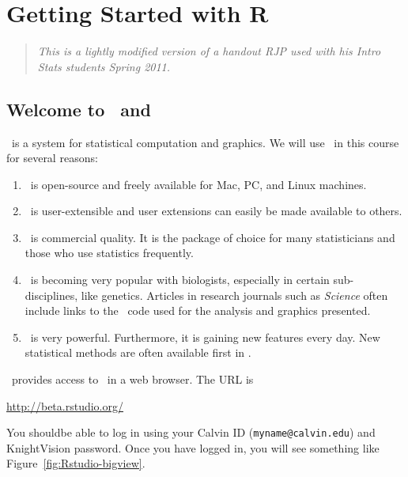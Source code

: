 \chapter{Getting Started with R}




\begin{quote}
\emph{This is a lightly modified version of a handout RJP used with his 
Intro Stats students Spring 2011.}
\end{quote}

\label{app:StartingR}

\section{Welcome to \R\ and \Rstudio}

\R\ is a system for statistical computation and graphics.  We will use \R\ in this course 
for several reasons:
\begin{enumerate}
\item \R\ is open-source and freely available for Mac, PC, and Linux machines.
\item \R\ is user-extensible and user extensions can easily be made available to others.
\item \R\ is commercial quality.  It is the package of choice for many statisticians and those
who use statistics frequently.  
\item \R\ is becoming very popular with biologists, especially in certain
sub-disciplines, like genetics.  Articles in research journals such as \textit{Science} often
include links to the \R\ code used for the analysis and graphics presented.
\item
\R\ is very powerful.  Furthermore, it is gaining new features every day.  New statistical 
methods are often available first in \R.
\end{enumerate}

\Rstudio\ provides access to \R\ in a web browser.  The URL is
\begin{center}
\url{http://beta.rstudio.org/}
\end{center}
You shouldbe able to log in using your Calvin ID (\texttt{myname@calvin.edu})  
and KnightVision password.  Once you have logged in, you will see something like 
Figure~\ref{fig:Rstudio-bigview}.

